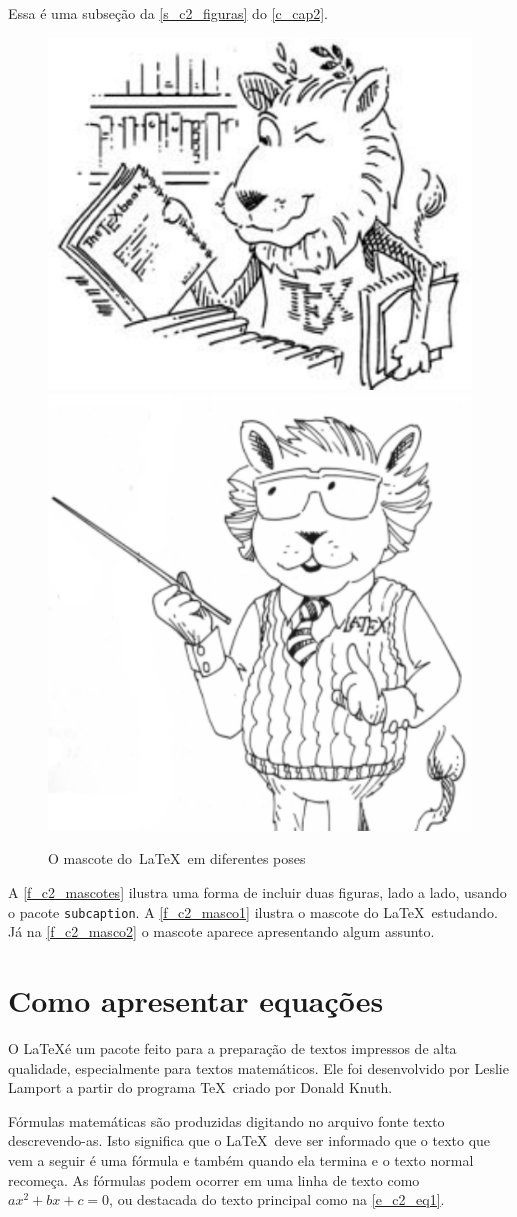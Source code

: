 Essa é uma subseção da \autoref{s_c2_figuras} do \autoref{c_cap2}. 

\begin{figure}[ht]
	\centering
	\caption{O mascote do~\LaTeX~em diferentes poses}\label{f_c2_mascotes}
		{\includegraphics[width=.4\textwidth]{03-elementos/03.2_textual/03.2.1_fig/lion.pdf}}
		{\includegraphics[width=.4\textwidth]{03-elementos/03.2_textual/03.2.1_fig/latex_lion.pdf}}
\end{figure}


A \autoref{f_c2_mascotes} ilustra uma forma de incluir duas figuras, lado a lado, usando o pacote \texttt{subcaption}. A \autoref{f_c2_masco1} ilustra o mascote do \LaTeX~estudando. Já na \autoref{f_c2_masco2} o mascote aparece apresentando algum assunto. 


\section{Como apresentar equações}
\label{s_c2_equacoes}

O \LaTeX é um pacote feito para a preparação de textos impressos de alta qualidade, especialmente
para textos matemáticos. Ele foi desenvolvido por Leslie Lamport a partir do programa
\TeX~criado por Donald Knuth.

Fórmulas matemáticas são produzidas digitando no arquivo fonte texto descrevendo-as. Isto
significa que o \LaTeX~deve ser informado que o texto que vem a seguir é uma fórmula e também
quando ela termina e o texto normal recomeça. As fórmulas podem ocorrer em uma linha de
texto como $ax^2 + bx + c = 0$, ou destacada do texto principal como na \autoref{e_c2_eq1}.


